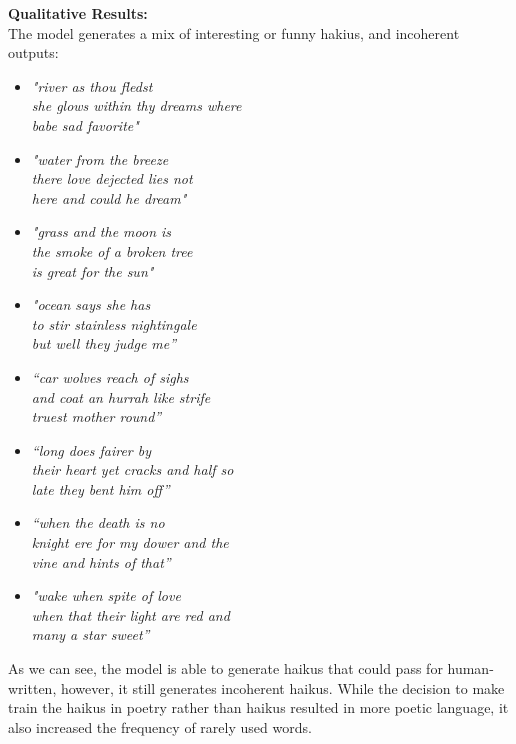 \documentclass{article} %
\begin{document}
\textbf{Qualitative Results:} \\
The model generates a mix of interesting or funny hakius, and incoherent outputs:
\begin{itemize}


  \item \textit{"river as thou fledst \\
  she glows within thy dreams where \\
  babe sad favorite"}

  \item \textit{"water from the breeze \\
  there love dejected lies not \\
  here and could he dream"}

  \item \textit{"grass and the moon is \\
  the smoke of a broken tree \\
  is great for the sun"}

  \item \textit{"ocean says she has \\
  to stir stainless nightingale \\
  but well they judge me”}

  \item \textit{“car wolves reach of sighs \\
  and coat an hurrah like strife \\
  truest mother round”}

  \item \textit{“long does fairer by \\
  their heart yet cracks and half so \\
  late they bent him off”}

  \item \textit{“when the death is no \\
  knight ere for my dower and the \\
  vine and hints of that”}

  \item \textit{"wake when spite of love \\
  when that their light are red and \\
  many a star sweet”}

\end{itemize}

As we can see, the model is able to generate haikus that could pass for human-written, however, it still generates
incoherent haikus.
While the decision to make train the haikus in poetry rather than haikus resulted in more poetic language,
it also increased the frequency of rarely used words.
\end{document}
